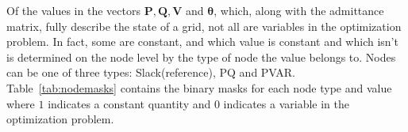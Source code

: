 \indent Of the values in the vectors $\boldsymbol{P}, \boldsymbol{Q}, \boldsymbol{V}$ and $\boldsymbol{\theta}$,
which, along with the admittance matrix, fully describe the state of a grid, not all are variables in the optimization problem.
In fact, some are constant, and which value is constant and which isn't is determined on the node level by the type of node the value belongs to.
Nodes can be one of three types: Slack(reference), PQ and PVAR.
Table~\ref{tab:nodemasks} contains the binary masks for each node type and value where $1$ indicates a constant quantity and $0$
indicates a variable in the optimization problem.